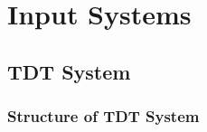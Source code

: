 \documentclass[letterpaper,10pt,english]{sphinxmanual}
\begin{document}
\chapter{Input Systems}
\label{\detokenize{inputsystems:input-systems}}\label{\detokenize{inputsystems::doc}}

\section{TDT System}
\label{\detokenize{systemtdt:tdt-system}}\label{\detokenize{systemtdt::doc}}

\subsection{Structure of TDT System}
\label{\detokenize{systemtdt:structure-of-tdt-system}}
\end{document}
